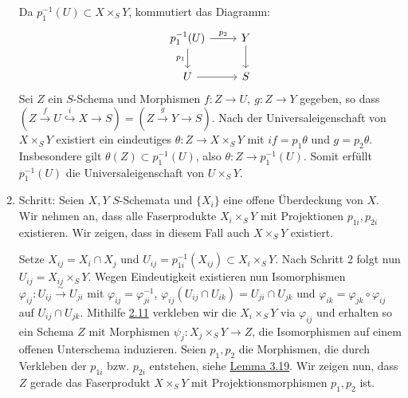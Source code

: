 \documentclass[11pt,b5paper,openany]{memoir}
\begin{document}
\begin{enumerate}
Da $p_1^{-1}(U)\subset X\times_SY$, kommutiert das Diagramm:
\[\begin{tikzcd}
p_1^{-1}(U)\ar[r, "p_2"]\ar[d, "p_1"'] & Y\ar[d]\\
U\ar[r] & S
\end{tikzcd} \]
Sei $Z$ ein $S$-Schema und Morphismen $f:Z\to U,\ g:Z\to Y$ gegeben, so dass $(Z\stackrel{f}{\to} U\stackrel{i}{\hookrightarrow} X\to S)=(Z\stackrel{g}{\to} Y\to S)$. Nach der Universaleigenschaft von $X\times_SY$ existiert ein eindeutiges $\theta:Z\to X\times_SY$ mit $if=p_1\theta$ und $g=p_2\theta$. Insbesondere gilt $\theta(Z)\subset p_1^{-1}(U)$, also $\theta:Z\to p_1^{-1}(U)$. Somit erfüllt $p_1^{-1}(U)$ die Universaleigenschaft von $U\times_SY$.
\item Schritt: Seien $X,Y$ $S$-Schemata und $\{X_i\}$ eine offene Überdeckung von $X$. Wir nehmen an, dass alle Faserprodukte $X_i\times_SY$ mit Projektionen $p_{1i},p_{2i}$ existieren. Wir zeigen, dass in diesem Fall auch $X\times_SY$ existiert.

Setze $X_{ij}=X_i\cap X_j$ und $U_{ij}=p_{1i}^{-1}(X_{ij})\subset X_i\times_SY$. Nach Schritt 2 folgt nun $U_{ij}=X_{ij}\times_SY$. Wegen Eindeutigkeit existieren nun Isomorphismen $\varphi_{ij}:U_{ij}\stackrel{\sim}{\to}U_{ji}$ mit $\varphi_{ij}=\varphi_{ji}^{-1}$, $\varphi_{ij}(U_{ij}\cap U_{ik})=U_{ji}\cap U_{jk}$ und $\varphi_{ik}=\varphi_{jk}\circ\varphi_{ij}$ auf $U_{ij}\cap U_{jk}$. Mithilfe \hyperref[2.11]{2.11} verkleben wir die $X_i\times_SY$ via $\varphi_{ij}$ und erhalten so ein Schema $Z$ mit Morphismen $\psi_j:X_j\times_SY\to Z$, die Isomorphismen auf einem offenen Unterschema induzieren. Seien $p_1,p_2$ die Morphismen, die durch Verkleben der $p_{1i}$ bzw. $p_{2i}$ entstehen, siehe \hyperref[3.19]{Lemma 3.19}. Wir zeigen nun, dass $Z$ gerade das Faserprodukt $X\times_SY$ mit Projektionsmorphismen $p_1,p_2$ ist.


\end{enumerate}
\end{document}
